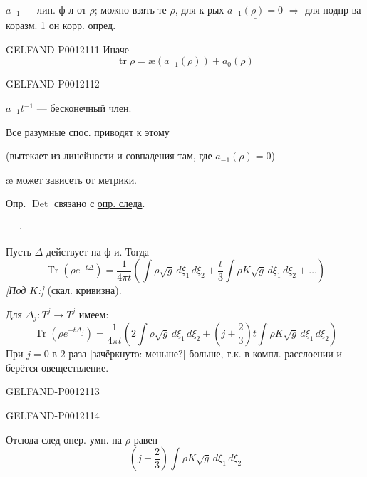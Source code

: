 \(a_{-1}\) --- лин. ф-л от \(\rho\); можно взять те \(\rho\), для к-рых \(\underline{a_{-1}(\rho)=0}\)
\(\Rightarrow\) для подпр-ва коразм. 1 он корр. опред.


\begin{GelfandAdjacentEvidence}{GELFAND-P001211}{1}
Иначе
\[
\operatorname{tr}\rho=\text{\ae}(a_{-1}(\rho))+a_0(\rho)
\]
\end{GelfandAdjacentEvidence}
\begin{GelfandAdjacentEvidence}{GELFAND-P001211}{2}


\(a_{-1}t^{-1}\) --- бесконечный член.

Все разумные спос. приводят к этому

(вытекает из линейности и совпадения там, где \(a_{-1}(\rho)=0\))

\(\text{\ae}\) может зависеть от метрики.

Опр. \(\operatorname{Det}\) связано с \underline{опр. следа}.

\begin{center}--- \(\cdot\) ---\end{center}
Пусть \(\Delta\) действует на ф-и. Тогда
\[
\operatorname{Tr}(\rho e^{-t\Delta})=
\frac1{4\pi t}\left(\int\rho\sqrt g\,d\xi_1\,d\xi_2
+\frac t3\int\rho K\sqrt g\,d\xi_1\,d\xi_2+\ldots\right)
\]
\textit{[Под \(K\):]} (скал. кривизна).

Для \(\Delta_j:T^j\to T^j\) имеем:
\[
\operatorname{Tr}(\rho e^{-t\Delta_j})=
\frac1{4\pi t}\left(2\int\rho\sqrt g\,d\xi_1\,d\xi_2
+\left(j+\frac23\right)t\int\rho K\sqrt g\,d\xi_1\,d\xi_2\right)
\]
При \(j=0\) в 2 раза [зачёркнуто: меньше?] больше, т.к. в компл. расслоении и берётся овеществление.
\end{GelfandAdjacentEvidence}
\begin{GelfandAdjacentEvidence}{GELFAND-P001211}{3}

\end{GelfandAdjacentEvidence}
\begin{GelfandAdjacentEvidence}{GELFAND-P001211}{4}


Отсюда след опер. умн. на \(\rho\) равен
\[
\left(j+\frac23\right)\int\rho K\sqrt g\,d\xi_1\,d\xi_2
\]
\end{GelfandAdjacentEvidence}
